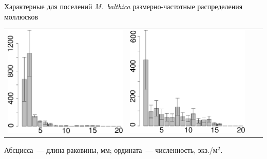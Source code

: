 \documentclass{beamer}
\begin{document}
\begin{frame}{Характерные для поселений {\it M.~balthica} размерно-частотные распределения моллюсков}
\begin{tabularx}{\linewidth}{XX|XX}
			\includegraphics[width=\linewidth]{sizestr2_1999_.pdf} &
			\includegraphics[width=\linewidth]{zostera_zone2_2004_.pdf}  \\
\end{tabularx}
{\tiny Абсцисса~--- длина раковины, мм; ордината~--- численность, экз./м$^2$.}
\end{frame}
\end{document}
